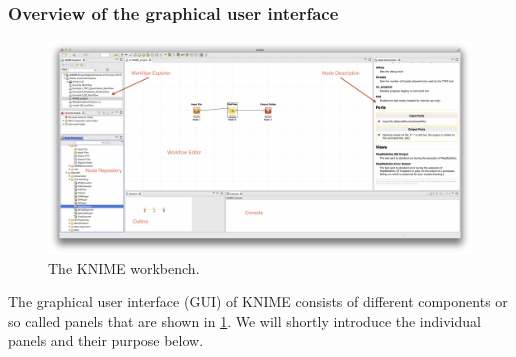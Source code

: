\subsubsection{Overview of the graphical user interface}

\begin{figure}
\includegraphics[width=\textwidth]{graphics/knime_setup/knime_workbench_marked}
\caption{The KNIME workbench.}
\label{fig:knime_workbench}
\end{figure}

The graphical user interface (GUI) of KNIME consists of different components or so called panels that are shown in \cref{fig:knime_workbench}.
We will shortly introduce the individual panels and their purpose below.

